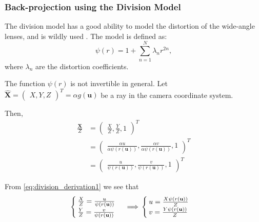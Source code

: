 \subsubsection{Back-projection using the Division Model}\label{subsub:back_projection_using_the_division_model}

The division model has a good ability to model the distortion of the wide-angle
lenses, and is wildly used . The model is defined as:
\begin{equation}
	\psi(r) = 1 + \sum_{n = 1}^{N} \lambda_n r^{2n},
\end{equation}
where \(\lambda_n\) are the distortion coefficients.

The function \(\psi(r)\) is not invertible in general.
Let \(\mathbf{\widehat{X}} = \begin{pmatrix}
	X, Y, Z
\end{pmatrix}^{T} = \alpha g(\mathbf{u})\) be a ray in the camera coordinate system.

Then,
\begin{align}
	\frac{\mathbf{X}}{Z} & =
	\begin{pmatrix}
		\frac{X}{Z}, \frac{Y}{Z}, 1
	\end{pmatrix}^{T}                               \\                                & =
	\begin{pmatrix}
		\frac{\alpha u}{\alpha \psi(r(\mathbf{u}))},
		\frac{\alpha v}{\alpha \psi(r(\mathbf{u}))},
		1
	\end{pmatrix}^{T}  \\
	                     & = \label{eq:division_derivation1}
	\begin{pmatrix}
		\frac{u}{\psi(r(\mathbf{u}))},
		\frac{v}{\psi(r(\mathbf{u}))},
		1
	\end{pmatrix}^{T}
\end{align}

From \ref{eq:division_derivation1} we see that
\begin{equation} \label{eq:division_derivation2}
	\begin{cases}
		\frac{X}{Z} = \frac{u}{\psi(r(\mathbf{u}))} \\
		\frac{Y}{Z} = \frac{v}{\psi(r(\mathbf{u}))}
	\end{cases} \implies \\
	\begin{cases}
		u = \frac{X \psi(r(\mathbf{u}))}{Z} \\
		v = \frac{Y \psi(r(\mathbf{u}))}{Z}
	\end{cases}
\end{equation}

